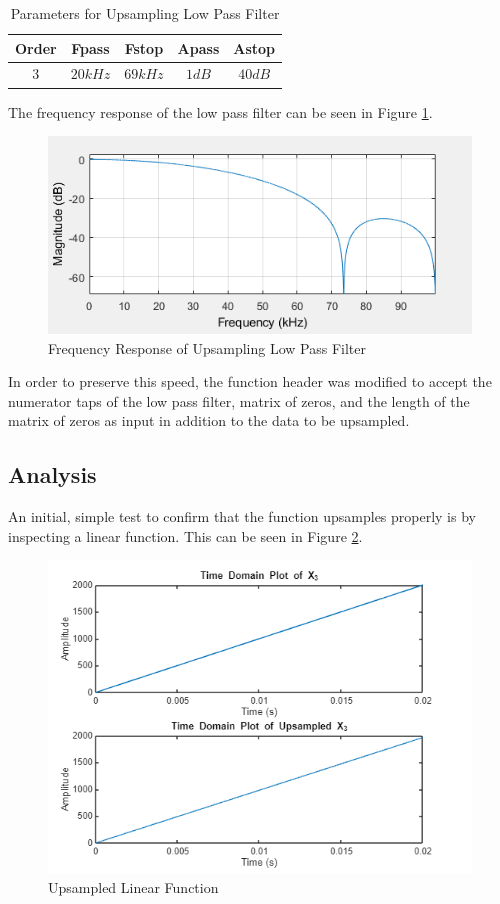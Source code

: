 \begin{table}[H]
    \centering
    \begin{tabular}{c|cccc}
        Order & Fpass & Fstop & Apass & Astop \\ \hline
        3 & $20  \unit{kHz}$ & $69  \unit{kHz}$ & $1  \unit{dB} $ & $40  \unit{dB}$
    \end{tabular}
    \caption{Parameters for Upsampling Low Pass Filter}
    \label{tab:upsample_filter}
\end{table}

The frequency response of the low pass filter can be seen in Figure \ref{fig:upsample_freq_response}.

\begin{figure}[H]
    \centering
    \includegraphics[width=0.5\linewidth]{figures/upsample_freq_response.png}
    \caption{Frequency Response of Upsampling Low Pass Filter}
    \label{fig:upsample_freq_response}
\end{figure}

In order to preserve this speed, the function header was modified to accept the numerator taps of the low pass filter, matrix of zeros, and the length of the matrix of zeros as input in addition to the data to be upsampled.


\subsection{Analysis}

An initial, simple test to confirm that the function upsamples properly is by inspecting a linear function.  This can be seen in Figure \ref{fig:linear_upsample_whole}. 

\begin{figure}[H]
    \centering
    \includegraphics[width=0.5\linewidth]{figures/linear_upsample_whole.png}
    \caption{Upsampled Linear Function}
    \label{fig:linear_upsample_whole}
\end{figure}

